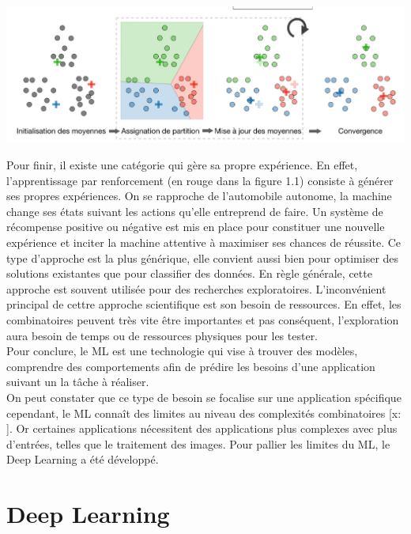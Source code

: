 \documentclass[12pt,a4paper,french]{report}
\begin{document}
\begin{center}
	\includegraphics[scale=0.4]{k_means}
	\label{fig1}
\end{center}

Pour finir, il existe une catégorie qui gère sa propre expérience. En effet, l'apprentissage par renforcement (en rouge dans la figure 1.1) consiste à générer ses propres expériences. On se rapproche de l'automobile autonome, la machine change ses états suivant les actions qu'elle entreprend de faire. Un système de récompense positive ou négative est mis en place pour constituer une nouvelle expérience et inciter la machine attentive à maximiser ses chances de réussite. Ce type d'approche est la plus générique, elle convient aussi bien pour optimiser des solutions existantes que pour classifier des données. En règle générale, cette approche est souvent utilisée pour des recherches exploratoires. L'inconvénient principal de cettre approche scientifique est son besoin de ressources. En effet, les combinatoires peuvent très vite être importantes et pas conséquent, l'exploration aura besoin de temps ou de ressources physiques pour les tester.\\

Pour conclure, le ML est une technologie qui vise à trouver des modèles, comprendre des comportements afin de prédire les besoins d'une application suivant un la tâche à réaliser.\\

On peut constater que ce type de besoin se focalise sur une application spécifique cependant, le ML connaît des limites au niveau des complexités combinatoires [x: ]. Or certaines applications nécessitent des applications plus complexes avec plus d'entrées, telles que le traitement des images. Pour pallier les limites du ML, le Deep Learning a été développé.


\chapter{Deep Learning}
\end{document}
